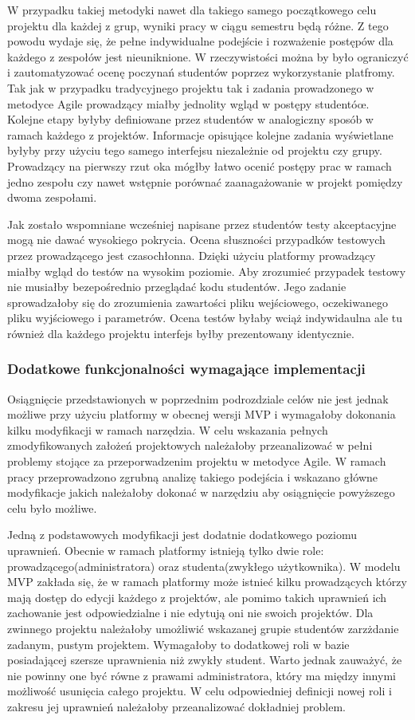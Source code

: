 W przypadku takiej metodyki nawet dla takiego samego początkowego celu projektu dla każdej z grup, wyniki pracy w ciągu semestru będą różne.
Z tego powodu wydaje się, że pełne indywidualne podejście i rozważenie postępów dla każdego z zespołów jest nieuniknione.
W rzeczywistości można by było ograniczyć i zautomatyzować ocenę poczynań studentów poprzez wykorzystanie platfromy.
Tak jak w przypadku tradycyjnego projektu tak i zadania prowadzonego w metodyce Agile prowadzący miałby jednolity wgląd w postępy studentóœ.
Kolejne etapy byłyby definiowane przez studentów w analogiczny sposób w ramach każdego z projektów.
Informacje opisujące kolejne zadania wyświetlane byłyby przy użyciu tego samego interfejsu niezależnie od projektu czy grupy.
Prowadzący na pierwszy rzut oka mógłby łatwo ocenić postępy prac w ramach jedno zespołu czy nawet wstępnie porównać zaanagażowanie w projekt pomiędzy dwoma zespołami.

Jak zostało wspomniane wcześniej napisane przez studentów testy akceptacyjne mogą nie dawać wysokiego pokrycia.
Ocena słuszności przypadków testowych przez prowadzącego jest czasochłonna.
Dzięki użyciu platformy prowadzący miałby wgląd do testów na wysokim poziomie.
Aby zrozumieć przypadek testowy nie musiałby bezepośrednio przeglądać kodu studentów.
Jego zadanie sprowadzałoby się do zrozumienia zawartości pliku wejściowego, oczekiwanego pliku wyjściowego i parametrów.
Ocena testów byłaby wciąż indywidaulna ale tu również dla każdego projektu interfejs byłby prezentowany identycznie.

\subsubsection{Dodatkowe funkcjonalności wymagające implementacji}

Osiągnięcie przedstawionych w poprzednim podrozdziale celów nie jest jednak możliwe przy użyciu platformy w obecnej wersji MVP i wymagałoby dokonania kilku modyfikacji w ramach narzędzia.
W celu wskazania pełnych zmodyfikowanych założeń projektowych należałoby przeanalizować w pełni problemy stojące za przeporwadzenim projektu w metodyce Agile.
W ramach pracy przeprowadzono zgrubną analizę takiego podejścia i wskazano główne modyfikacje jakich należałoby dokonać w narzędziu aby osiągnięcie powyższego celu było możliwe.

Jedną z podstawowych modyfikacji jest dodatnie dodatkowego poziomu uprawnień.
Obecnie w ramach platformy istnieją tylko dwie role: prowadzącego(administratora) oraz studenta(zwykłego użytkownika).
W modelu MVP zakłada się, że w ramach platformy może istnieć kilku prowadzących którzy mają dostęp do edycji każdego z projektów, ale pomimo takich uprawnień ich zachowanie jest odpowiedzialne i nie edytują oni nie swoich projektów.
Dla zwinnego projektu należałoby umożliwić wskazanej grupie studentów zarzżdanie zadanym, pustym projektem.
Wymagałoby to dodatkowej roli w bazie posiadającej szersze uprawnienia niż zwykły student.
Warto jednak zauważyć, że nie powinny one być równe z prawami administratora, który ma między innymi możliwość usunięcia całego projektu.
W celu odpowiedniej definicji nowej roli i zakresu jej uprawnień należałoby przeanalizować dokładniej problem.

